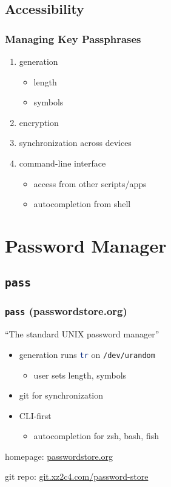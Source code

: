\documentclass[]{beamer}
\newcommand{\cli}[1]{\texttt{#1}}
\renewcommand{\sh}[1]{\lstinline[columns=fixed,language=sh]{#1}}
\begin{document}
\subsection{Accessibility}
\begin{frame}
  \frametitle{Managing Key Passphrases}
  \begin{enumerate}
  \item<1->
    generation
    \begin{itemize}
    \item
      length
    \item
      symbols
    \end{itemize}
  \item<1->
    encryption
  \item<1->
    synchronization across devices
  \item<2->
    command-line interface
    \begin{itemize}
    \item
      access from other scripts/apps
    \item
      autocompletion from shell
    \end{itemize}
  \end{enumerate}
\end{frame}

\section{Password Manager}
\subsection{\sh{pass}}
\begin{frame}
  \frametitle{\sh{pass} (passwordstore.org)}
  ``The standard UNIX password manager''
  \vspace{1em}
  
  \begin{itemize}
  \item
    generation runs \sh{tr} on \cli{/dev/urandom}
    \begin{itemize}
    \item
      user sets length, symbols
    \end{itemize}
  \item
    git for synchronization
  \item
    CLI-first
    \begin{itemize}
    \item
      autocompletion for zsh, bash, fish
    \end{itemize}
  \end{itemize}
  \vspace{1em}
  homepage: \href{http://www.passwordstore.org}{passwordstore.org}
  
  git repo: \href{https://git.xz2c4.com/password-store/}{git.xz2c4.com/password-store}
\end{frame}
\end{document}
